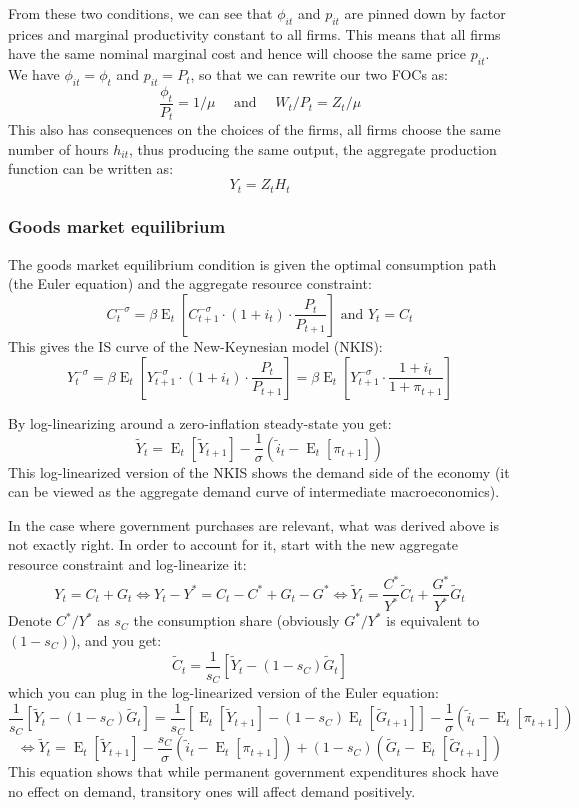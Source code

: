 \documentclass[12pt]{report}
\newcommand{\Et}[1]{\operatorname{E}_t\left[#1\right]}
\begin{document}
From these two conditions, we can see that $\phi_{it}$ and $p_{it}$ are pinned down by factor prices and marginal productivity constant to all firms. This means that all firms have the same nominal marginal cost and hence will choose the same price $p_{it}$. We have $\phi_{it} = \phi_t $ and $ p_{it} = P_t $, so that we can rewrite our two FOCs as: $$ \frac{\phi_t}{P_t} = 1/\mu \quad \text{ and }\quad  W_t/P_t = Z_t/\mu $$ This also has consequences on the choices of the firms, all firms choose the same number of hours $h_{it}$, thus producing the same output, the aggregate production function can be written as: $$Y_t = Z_t H_t $$

\subsubsection{Goods market equilibrium}

The goods market equilibrium condition is given the optimal consumption path (the Euler equation) and the aggregate resource constraint: $$ C_t^{-\sigma} = \beta\Et{C_{t+1}^{-\sigma} \cdot (1+i_t) \cdot \frac{P_t}{P_{t+1}}} \text{ and } Y_t = C_t $$
This gives the IS curve of the New-Keynesian model (NKIS): $$ Y_t^{-\sigma} = \beta\Et{Y_{t+1}^{-\sigma} \cdot (1+i_t) \cdot \frac{P_t}{P_{t+1}}} = \beta\Et{Y_{t+1}^{-\sigma}  \cdot \frac{1+i_t}{1 + \pi_{t+1}}} $$

By log-linearizing around a zero-inflation steady-state you get: $$ \tilde Y_t = \Et{\tilde Y_{t+1}} - \frac{1}{\sigma}\left(\tilde i_t - \Et{\pi_{t+1}}\right) $$ This log-linearized version of the NKIS shows the demand side of the economy (it can be viewed as the aggregate demand curve of intermediate macroeconomics).

In the case where government purchases are relevant, what was derived above is not exactly right. In order to account for it, start with the new aggregate resource constraint and log-linearize it: $$Y_t = C_t + G_t \Leftrightarrow Y_t - Y^* = C_t - C^* + G_t - G^* \Leftrightarrow \tilde Y_t = \frac{C^*}{Y^*}\tilde C_t + \frac{G^*}{Y^*} \tilde G_t $$ Denote $C^*/Y^*$ as $s_C$ the consumption share (obviously $G^*/Y^*$ is equivalent to $(1-s_C)$), and you get: $$ \tilde C_t = \frac{1}{s_C} \left[ \tilde Y_t - (1 - s_C) \tilde G_t \right] $$ which you can plug in the log-linearized version of the Euler equation: $$\frac{1}{s_C} \left[ \tilde Y_t - (1 - s_C) \tilde G_t \right] = \frac{1}{s_C} \left[  \Et{\tilde Y_{t+1}} - (1 - s_C)  \Et{\tilde G_{t+1}} \right]- \frac{1}{\sigma}\left(\tilde i_t - \Et{\pi_{t+1}}\right) $$ 
$$ \Leftrightarrow \tilde Y_t = \Et{\tilde Y_{t+1}} - \frac{s_C}{\sigma}\left(\tilde i_t - \Et{\pi_{t+1}}\right) + (1-s_C)\left(\tilde G_t - \Et{\tilde G_{t+1}}\right) $$ This equation shows that while permanent government expenditures shock have no effect on demand, transitory ones will affect demand positively.
\end{document}
